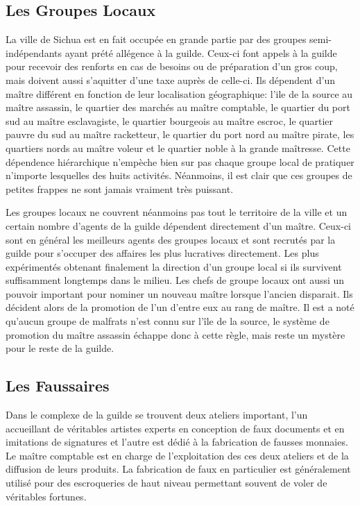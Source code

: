\subsection{Les Groupes Locaux}

La ville de Sichua est en fait occupée en grande partie par des groupes
semi-indépendants ayant prété allégence à la guilde. Ceux-ci font appels 
à la guilde pour recevoir des renforts en cas de besoins ou de préparation 
d'un gros coup, mais doivent aussi s'aquitter d'une taxe auprès de celle-ci. Ils dépendent
d'un maître différent en fonction de leur localisation géographique:
l'ile de la source au maître assassin, le quartier des marchés au maître
comptable, le quartier du port sud au maître esclavagiste, le quartier 
bourgeois au maître escroc, le quartier pauvre du sud au maître racketteur,
le quartier du port nord au maître pirate, les quartiers nords au maître 
voleur et le quartier noble à la grande maîtresse. Cette dépendence hiérarchique 
n'empèche bien sur pas chaque groupe local de pratiquer n'importe lesquelles des huits
activités. Néanmoins, il est clair que ces groupes de petites frappes ne sont
jamais vraiment très puissant. 

Les groupes locaux ne couvrent néanmoins pas tout le territoire de la ville
et un certain nombre d'agents de la guilde dépendent directement d'un maître.
Ceux-ci sont en général les meilleurs agents des groupes locaux et sont recrutés
par la guilde pour s'occuper des affaires les plus lucratives directement. 
Les plus expérimentés obtenant finalement la direction d'un groupe local
si ils survivent suffisamment longtemps dans le milieu. Les chefs de groupe
locaux ont aussi un pouvoir important pour nominer un nouveau maître
lorsque l'ancien disparait. Ils décident alors de la promotion de l'un d'entre 
eux au rang de maître. Il est a noté qu'aucun groupe de malfrats n'est connu 
sur l'île de la source, le système de promotion du maître assassin échappe donc
à cette règle, mais reste un mystère pour le reste de la guilde.



\subsection{Les Faussaires}

Dans le complexe de la guilde se trouvent deux ateliers important, l'un
accueillant de véritables artistes experts en conception de faux documents
et en imitations de signatures et l'autre est dédié à la fabrication de fausses 
monnaies. Le maître comptable est en charge de l'exploitation des ces deux
ateliers et de la diffusion de leurs produits. La fabrication de faux en
particulier est généralement utilisé pour des escroqueries de haut niveau
permettant souvent de voler de véritables fortunes.

